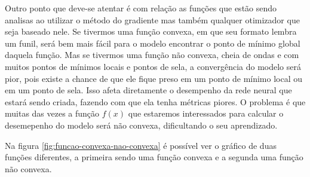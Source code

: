 Outro ponto que deve-se atentar é com relação as funções que estão sendo analisas ao utilizar o método do gradiente mas também qualquer otimizador que seja baseado nele. Se tivermos uma função convexa, em que seu formato lembra um funil, será bem mais fácil para o modelo encontrar o ponto de mínimo global daquela função. Mas se tivermos uma função não convexa, cheia de ondas e com muitos pontos de mínimos locais e pontos de sela, a convergência do modelo será pior, pois existe a chance de que ele fique preso em um ponto de mínimo local ou em um ponto de sela. Isso afeta diretamente o desempenho da rede neural que estará sendo criada, fazendo com que ela tenha métricas piores. O problema é que muitas das vezes a função $f(x)$ que estaremos interessados para calcular o desemepenho do modelo será não convexa, dificultando o seu aprendizado.

Na figura \ref{fig:funcao-convexa-nao-convexa} é possível ver o gráfico de duas funções diferentes, a primeira sendo uma função convexa e a segunda uma função não convexa.

